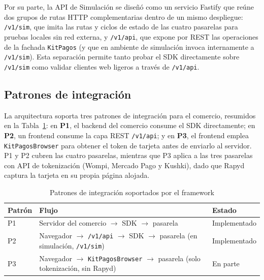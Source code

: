 Por su parte, la API de Simulación se diseñó como un servicio Fastify que reúne dos grupos de rutas HTTP complementarias dentro de un mismo despliegue: \texttt{/v1/sim}, que imita las rutas y ciclos de estado de las cuatro pasarelas para pruebas locales sin red externa, y \texttt{/v1/api}, que expone por REST las operaciones de la fachada \texttt{KitPagos} (y que en ambiente de simulación invoca internamente a \texttt{/v1/sim}). Esta separación permite tanto probar el SDK directamente sobre \texttt{/v1/sim} como validar clientes web ligeros a través de \texttt{/v1/api}.

\subsection{Patrones de integración}

La arquitectura soporta tres patrones de integración para el comercio, resumidos en la Tabla~\ref{tab:patrones-memoria}: en \textbf{P1}, el backend del comercio consume el SDK directamente; en \textbf{P2}, un frontend consume la capa REST \texttt{/v1/api}; y en \textbf{P3}, el frontend emplea \texttt{KitPagosBrowser} para obtener el token de tarjeta antes de enviarlo al servidor. P1 y P2 cubren las cuatro pasarelas, mientras que P3 aplica a las tres pasarelas con API de tokenización (Wompi, Mercado Pago y Kushki), dado que Rapyd captura la tarjeta en su propia página alojada.

\begin{table}[H]
  \centering
  \small
  \renewcommand{\arraystretch}{1.2}
  \begin{tabularx}{\textwidth}{|>{\centering\arraybackslash}p{1.25cm}|>{\raggedright\arraybackslash}X|>{\centering\arraybackslash}p{2.2cm}|}
    \hline
    \textbf{Patrón} & \textbf{Flujo} & \textbf{Estado} \\ \hline
    P1 & Servidor del comercio $\rightarrow$ SDK $\rightarrow$ pasarela & Implementado \\ \hline
    P2 & Navegador $\rightarrow$ \texttt{/v1/api} $\rightarrow$ SDK $\rightarrow$ pasarela (en simulación, \texttt{/v1/sim}) & Implementado \\ \hline
    P3 & Navegador $\rightarrow$ \texttt{KitPagosBrowser} $\rightarrow$ pasarela (solo tokenización, sin Rapyd) & En parte \\ \hline
  \end{tabularx}
  \caption{Patrones de integración soportados por el framework}
  \label{tab:patrones-memoria}
\end{table}

